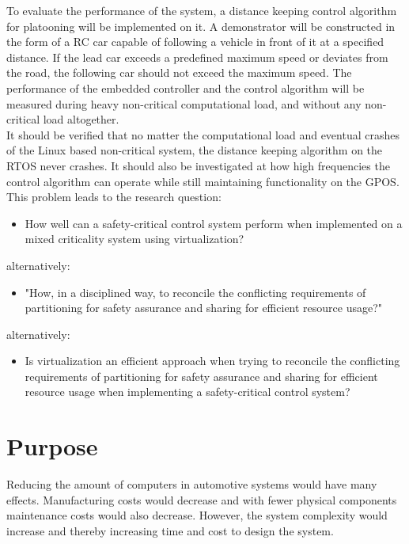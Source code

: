 To evaluate the performance of the system, a distance keeping control algorithm for platooning will be implemented on it. A demonstrator will be constructed in the form of a RC car capable of following a vehicle in front of it at a specified distance. If the lead car exceeds a predefined maximum speed or deviates from the road, the following car should not exceed the maximum speed. The performance of the embedded controller and the control algorithm will be measured during heavy non-critical computational load, and without any non-critical load altogether. \\

It should be verified that no matter the computational load and eventual crashes of the Linux based non-critical system, the distance keeping algorithm on the RTOS never crashes. It should also be investigated at how high frequencies the control algorithm can operate while still maintaining functionality on the GPOS. \\

This problem leads to the research question: 
\begin{itemize}
\item How well can a safety-critical control system perform when implemented on a mixed criticality system using virtualization?
\end{itemize}
alternatively:
\begin{itemize}
\item "How, in a disciplined way, to reconcile the conflicting requirements of partitioning for safety assurance and sharing for efficient resource usage?" \cite{burns2016}
\end{itemize}
alternatively:
\begin{itemize}
\item Is virtualization an efficient approach when trying to reconcile the conflicting requirements of partitioning for safety assurance and sharing for efficient resource usage when implementing a safety-critical control system?
\end{itemize}

\section{Purpose}
Reducing the amount of computers in automotive systems would have many effects. Manufacturing costs would decrease and with fewer physical components maintenance costs would also decrease. However, the system complexity would increase and thereby increasing time and cost to design the system. \\

